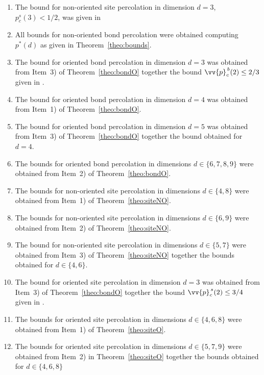 \documentclass{aptpub}
\begin{document}
\begin{enumerate}
\item[$(\ast)$] The bound for non-oriented site percolation in dimension $d = 3$, $p_c^s(3) < 1/2$,  was given in \cite{CR}
    \item[(1)]  All bounds for non-oriented bond percolation were obtained computing $p^{\ast}(d)$ as given in Theorem~\ref{theo:bounds}.
    \item[(2)] The bound for oriented bond percolation in dimension $d = 3$ was obtained from Item~3) of Theorem~\ref{theo:bondO} together the bound $\vv{p}^{\,b}_c(2)\leq 2/3$ given in \cite{L}.
    \item[(3)] The bound for oriented bond percolation in dimension $d = 4$ was obtained from Item~1) of Theorem~\ref{theo:bondO}.
    \item[(4)] The bound for oriented bond percolation in dimension $d = 5$ was obtained from Item~3) of Theorem~\ref{theo:bondO} together the bound obtained for $d=4$.
    \item[(5)] The bounds for oriented bond percolation in dimensions $d \in \{6, 7, 8, 9\}$ were obtained from Item~2) of Theorem~\ref{theo:bondO}. 
    \item[(6)] The bounds for non-oriented site percolation in dimensions $d \in \{4, 8\}$ were obtained from Item~1) of Theorem~\ref{theo:siteNO}. 
    \item[(7)] The bounds for non-oriented site percolation in dimensions $d \in \{6, 9\}$ were obtained from Item~2) of Theorem~\ref{theo:siteNO}. 
    \item[(8)] The bound for non-oriented site percolation in dimensions $d \in \{5, 7\}$ were obtained from Item~3) of Theorem~\ref{theo:siteNO} together the bounds obtained for $d \in \{4,6\}$.
    \item[(9)]  The bound for oriented site percolation in dimension $d = 3$ was obtained from Item~3) of Theorem~\ref{theo:bondO} together the bound $\vv{p}^{\,s}_c(2)\leq 3/4$ given in \cite{L}.
     \item[(10)] The bounds for oriented site percolation in dimensions $d \in \{4,6,8\} $ were obtained from Item~1) of Theorem~\ref{theo:siteO}. 
    \item[(11)]The bounds for oriented site percolation in dimensions $d \in \{5,7,9\}$ were obtained from Item~2) in Theorem~\ref{theo:siteO} together the bounds obtained for $d \in \{4,6,8\}$ 
\end{enumerate}
\end{document}
